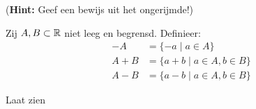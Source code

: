 \documentclass[week=1]{homework}
\begin{document}
\begin{questions}
        (\textbf{Hint:} Geef een bewijs uit het ongerijmde!)
        
        
        \question
        
        Zij $A,B \subset \mathbb{R}$ niet leeg en begrensd. Definieer:
        \begin{align*}
	        -A &= \{-a \mid a \in A\} \\
		    A + B &= \{a + b \mid a \in A, b \in B\} \\
			A - B &= \{a - b \mid a \in A, b \in B\}
        \end{align*}
        
        Laat zien
     \end{questions}
\end{document}
